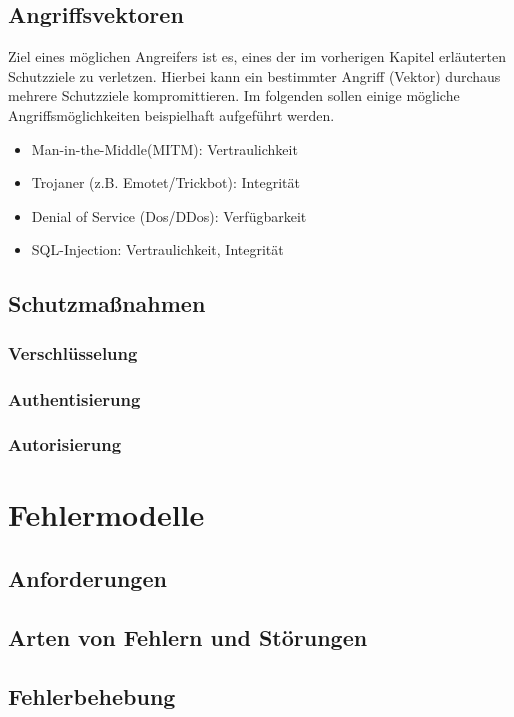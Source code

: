 \documentclass[12pt,a4paper,parskip=half]{scrreprt}
\begin{document}
\section{Angriffsvektoren}

Ziel eines möglichen Angreifers ist es, eines der im vorherigen Kapitel erläuterten Schutzziele zu verletzen. Hierbei kann ein bestimmter Angriff (Vektor) durchaus mehrere Schutzziele kompromittieren. Im folgenden sollen einige mögliche Angriffsmöglichkeiten beispielhaft aufgeführt werden.

\begin{itemize}
	\item Man-in-the-Middle(MITM): Vertraulichkeit
	\item Trojaner (z.B. Emotet/Trickbot): Integrität
	\item Denial of Service (Dos/DDos): Verfügbarkeit
	\item SQL-Injection: Vertraulichkeit, Integrität
\end{itemize}

\section{Schutzmaßnahmen}


\subsection{Verschlüsselung}


\subsection{Authentisierung}


\subsection{Autorisierung}


\chapter{Fehlermodelle}


\section{Anforderungen}


\section{Arten von Fehlern und Störungen}


\section{Fehlerbehebung}


\newpage

\nocite{*}
\thispagestyle{headings}


 
\end{document}
